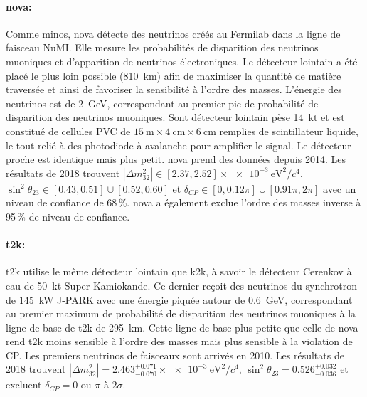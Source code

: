         \paragraph{\texorpdfstring{\gls{nova}}{NOVA}\cite{Acero2018}:} Comme \gls{minos}, \gls{nova} détecte des neutrinos créés au Fermilab dans la ligne de faisceau NuMI. Elle mesure les probabilités de disparition des neutrinos muoniques et d'apparition de neutrinos électroniques. Le détecteur lointain a été placé le plus loin possible (\SI{810}{\kilo\meter}) afin de maximiser la quantité de matière traversée et ainsi de favoriser la sensibilité à l'ordre des masses. L'énergie des neutrinos est de \SI{2}{\giga\electronvolt}, correspondant au premier pic de probabilité de disparition des neutrinos muoniques. Sont détecteur lointain pèse \SI{14}{\kilo\tonne} et est constitué de  cellules PVC de $\SI{15}{\meter}\times\SI{4}{\centi\meter}\times\SI{6}{\centi\meter}$ remplies de scintillateur liquide, le tout relié à des photodiode à avalanche pour amplifier le signal. Le détecteur proche est identique mais plus petit. \gls{nova} prend des données depuis 2014. Les résultats de 2018\cite{Acero2018} trouvent $|\Delta m_{32}^2|\in[2.37, 2.52]\times\SI{e-3}{\electronvolt\squared\per c^4}$, $\sin^2{\theta_{23}}\in [0.43, 0.51]\cup[0.52, 0.60]$ et $\delta_{CP}\in[0, 0.12\pi]\cup[0.91\pi, 2\pi]$ avec un niveau de confiance de 68\,\%. \gls{nova} a également exclue l'ordre des masses inverse à 95\,\% de niveau de confiance.
        
        \paragraph{\gls{t2k}\cite{Abe2018}:} \gls{t2k} utilise le même détecteur lointain que \gls{k2k}, à savoir le détecteur Cerenkov à eau de \SI{50}{\kilo\tonne} Super-Kamiokande. Ce dernier reçoit des neutrinos du synchrotron de \SI{145}{\kilo\watt} J-PARK avec une énergie piquée autour de \SI{0.6}{\giga\electronvolt}, correspondant au premier maximum de probabilité de disparition des neutrinos muoniques à la ligne de base de \gls{t2k} de \SI{295}{\kilo\meter}. Cette ligne de base plus petite que celle de \gls{nova} rend \gls{t2k} moins sensible à l'ordre des masses mais plus sensible à la violation de CP. Les premiers neutrinos de faisceaux sont arrivés en 2010. Les résultats de 2018\cite{Abe2018} trouvent $|\Delta m_{32}^2|=2.463^{+0.071}_{-0.070}\times\SI{e-3}{\electronvolt\squared\per c^4}$, $\sin^2{\theta_{23}}=0.526^{+0.032}_{-0.036}$ et excluent $\delta_{CP}=0$ ou $\pi$ à $2\sigma$.

